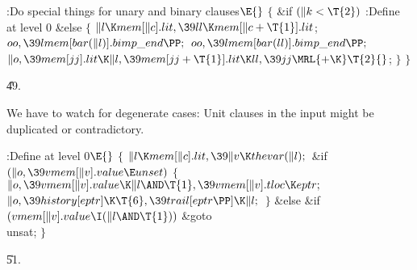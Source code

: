 \B{}:Do special things for unary and binary clauses\X${}%
\E{}$\6
${}\{{}$\1\6
\&{if} ${}(\|k<\T{2}){}$\1\5
:Define  at level 0\X\2\6
\&{else}\5
${}\{{}$\1\6
${}\|l\K\\{mem}[\|c].\\{lit},\39\\{ll}\K\\{mem}[\|c+\T{1}].\\{lit}{}$;\6
${}\\{oo},\39\\{lmem}[\\{bar}(\|l)].\\{bimp\_end}\PP;{}$\6
${}\\{oo},\39\\{lmem}[\\{bar}(\\{ll})].\\{bimp\_end}\PP;{}$\6
${}\|o,\39\\{mem}[\\{jj}].\\{lit}\K\|l,\39\\{mem}[\\{jj}+\T{1}].\\{lit}\K%
\\{ll},\39\\{jj}\MRL{+{\K}}\T{2}{}$;\6
\4${}\}{}$\2\6
\4${}\}{}$\2\par
\U49.\fi

We have to watch for degenerate cases: Unit clauses in the
input
might be duplicated or contradictory.

\Y\B\4:Define  at level 0\X${}\E{}$\6
${}\{{}$\1\6
${}\|l\K\\{mem}[\|c].\\{lit},\39\|v\K\\{thevar}(\|l);{}$\6
\&{if} ${}(\|o,\39\\{vmem}[\|v].\\{value}\E\\{unset}){}$\5
${}\{{}$\1\6
${}\|o,\39\\{vmem}[\|v].\\{value}\K\|l\AND\T{1},\39\\{vmem}[\|v].\\{tloc}\K%
\\{eptr};{}$\6
${}\|o,\39\\{history}[\\{eptr}]\K\T{6},\39\\{trail}[\\{eptr}\PP]\K\|l;{}$\6
\4${}\}{}$\5
\2\&{else} \&{if} ${}(\\{vmem}[\|v].\\{value}\I(\|l\AND\T{1})){}$\1\5
\&{goto} \\{unsat};\2\6
\4${}\}{}$\2\par
\U51.\fi

